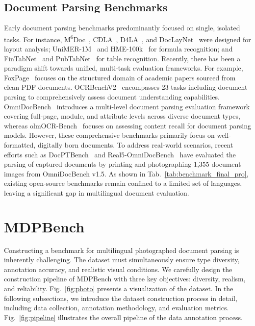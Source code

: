 \documentclass[runningheads]{llncs}
\begin{document}
\subsection{Document Parsing Benchmarks}

Early document parsing benchmarks predominantly focused on single, isolated tasks. For instance, M\textsuperscript{6}Doc~\cite{m6doc}, CDLA~\cite{cdla}, D4LA~\cite{d4la}, and DocLayNet~\cite{doclaynet} were designed for layout analysis; UniMER-1M~\cite{unimernet} and HME-100k~\cite{hme-100k} for formula recognition; and FinTabNet~\cite{fintabnet} and PubTabNet~\cite{pubtabnet} for table recognition. Recently, there has been a paradigm shift towards unified, multi-task evaluation frameworks. For example, FoxPage~\cite{foxpage} focuses on the structured domain of academic papers sourced from clean PDF documents. OCRBenchV2~\cite{ocrbenchv2} encompasses 23 tasks including document parsing to comprehensively assess document understanding capabilities. OmniDocBench~\cite{omnidocbench} introduces a multi-level document parsing evaluation framework covering full-page, module, and attribute levels across diverse document types, whereas olmOCR-Bench~\cite{olmocr} focuses on assessing content recall for document parsing models. However, these comprehensive benchmarks primarily focus on well-formatted, digitally born documents. To address real-world scenarios, recent efforts such as DocPTBench~\cite{docptbench} and Real5-OmniDocBench~\cite{real5-omnidocbench} have evaluated the parsing of captured documents by printing and photographing 1,355 document images from OmniDocBench v1.5. 
As shown in Tab.~\ref{tab:benchmark_final_pro}, existing open-source benchmarks remain confined to a limited set of languages, leaving a significant gap in multilingual document evaluation.








\section{MDPBench}
Constructing a benchmark for multilingual photographed document parsing is inherently challenging. The dataset must simultaneously ensure type diversity, annotation accuracy, and realistic visual conditions. We carefully design the construction pipeline of MDPBench with three key objectives: diversity, realism, and reliability. Fig.~\ref{fig:photo} presents a visualization of the dataset.
In the following subsections, we introduce the dataset construction process in detail, including data collection, annotation methodology, and evaluation metrics. Fig.~\ref{fig:pipeline} illustrates the overall pipeline of the data annotation process.
\end{document}
